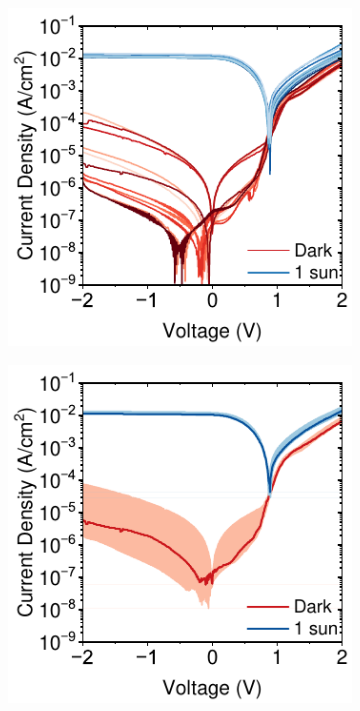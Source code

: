 \begin{figure}[ht!]
    \vspace{1em} %

    \begin{subfigure}[t]{0.4\textwidth}
        \centering
        \includegraphics[width=\textwidth]{chapters/material_properties/images/low_yield_discrete.pdf} %
        \caption{}
        \label{fig:ch2:low_yield_discrete}
    \end{subfigure}
    \hfill
    \begin{subfigure}[t]{0.4\textwidth}
        \centering
        \includegraphics[width=\textwidth]{chapters/material_properties/images/low_yield_median.pdf} %

\end{subfigure}
\end{figure}

